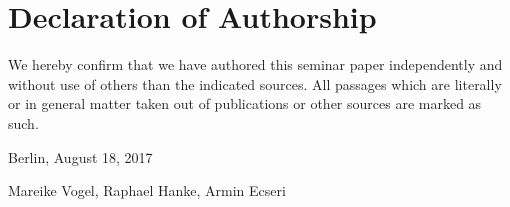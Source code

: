 \section*{Declaration of Authorship}

We hereby confirm that we have authored this seminar paper
independently and without use of others than the indicated
sources. All passages which are literally or in general matter
taken out of publications or other sources are marked as such.
\vspace{1cm}

Berlin, August 18, 2017 \vspace{0.5cm}

Mareike Vogel, Raphael Hanke, Armin Ecseri

\]

